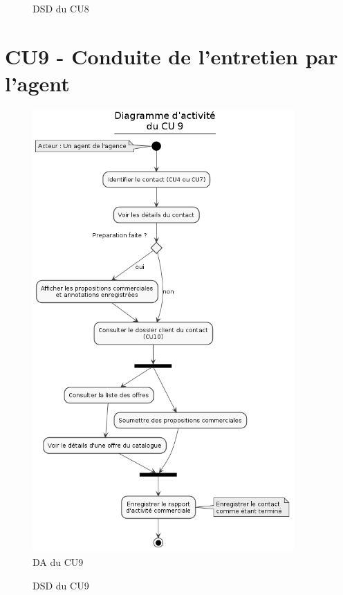 \begin{figure}[H]
\centering
\caption{DSD du CU8}
\end{figure}

\clearpage
\section{CU9 - Conduite de l’entretien par l’agent}

\begin{figure}[H]
\centering
\includegraphics[width=10cm]{figures/DA_CU9.png}
\caption{DA du CU9}
\end{figure}

\begin{figure}[H]
\centering
\caption{DSD du CU9}
\end{figure}

\clearpage
